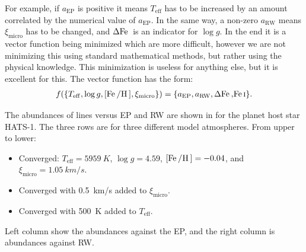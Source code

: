 For example, if $a_\mathrm{EP}$ is positive it means $T_\mathrm{eff}$ has to be increased by an
amount correlated by the numerical value of $a_\mathrm{EP}$. In the same way, a non-zero
$a_\mathrm{RW}$ means $\xi_\mathrm{micro}$ has to be changed, and $\Delta\ion{Fe}{}$ is an indicator
for $\log g$. In the end it is a vector function being minimized which are more difficult, however
we are not minimizing this using standard mathematical methods, but rather using the physical
knowledge. This minimization is useless for anything else, but it is excellent for this. The vector
function has the form:
\begin{align}
    f(\{T_\mathrm{eff}, \log g, [\ion{Fe}/\ion{H}], \xi_\mathrm{micro}\}) = \{a_\mathrm{EP}, a_\mathrm{RW}, \Delta\ion{Fe}, \ion{Fe}{I}\}.
\end{align}

The abundances of  lines versus EP and RW are shown in  for the planet
host star HATS-1. The three rows are for three different model atmospheres. From upper to lower:
\begin{itemize}
  \item Converged: $T_\mathrm{eff}=\SI{5959}{K}$,
                   $\log g=4.59$,
                   $[\ion{Fe}/\ion{H}]=-0.04$, and
                   $\xi_\mathrm{micro}=\SI{1.05}{km/s}$.
  \item Converged with \SI{0.5}{km/s} added to $\xi_\mathrm{micro}$.
  \item Converged with \SI{500}{K} added to $T_\mathrm{eff}$.
\end{itemize}
Left column show the abundances against the EP, and the right column is abundances against RW.

